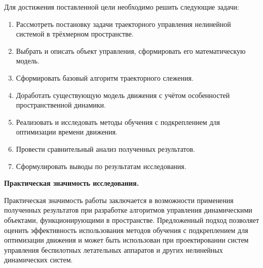 Для достижения поставленной цели необходимо решить следующие задачи:
\begin{enumerate}
    \item Рассмотреть постановку задачи траекторного управления нелинейной системой в трёхмерном пространстве.
    \item Выбрать и описать объект управления, сформировать его математическую модель.
    \item Сформировать базовый алгоритм траекторного слежения.
    \item Доработать существующую модель движения с учётом особенностей пространственной динамики.
    \item Реализовать и исследовать методы обучения с подкреплением для оптимизации времени движения.
    \item Провести сравнительный анализ полученных результатов.
    \item Сформулировать выводы по результатам исследования.
\end{enumerate}

\textbf{Практическая значимость исследования.}

Практическая значимость работы заключается в возможности применения полученных результатов при разработке алгоритмов управления динамическими объектами, функционирующими в пространстве.
Предложенный подход позволяет оценить эффективность использования методов обучения с подкреплением для оптимизации движения и может быть использован при проектировании систем управления беспилотных летательных аппаратов и других нелинейных динамических систем.